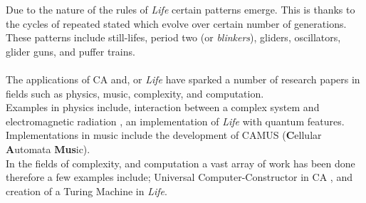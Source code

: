 Due to the nature of the rules of \textsl{Life} certain patterns emerge. This is thanks to the cycles of repeated stated which evolve over certain number of generations. These patterns include still-lifes, period two (or \textsl{blinkers}), gliders, oscillators, glider guns, and puffer trains.\citep{adamatzky2010game}
\\\\
The applications of CA and, or \textsl{Life} have sparked a number of research papers in fields such as physics, music, complexity, and computation. \\
Examples in physics include, interaction between a complex system and electromagnetic radiation \citep{conti}, an implementation of \textsl{Life} with quantum features.\citep{quantum}\\
Implementations in music include the development of CAMUS (\textbf{C}ellular \textbf{A}utomata \textbf{Mus}ic).\citep{music}\\
In the fields of complexity, and computation a vast array of work has been done therefore a few examples include; Universal Computer-Constructor in CA \citep{gou}, and creation of a Turing Machine in \textsl{Life}.\citep{ren}
